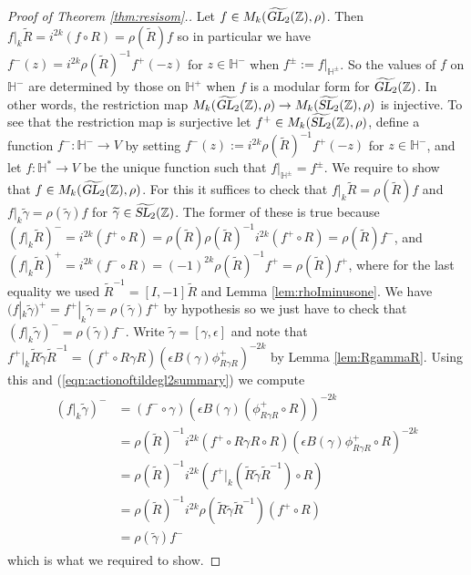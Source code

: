 \documentclass[aps,prd,groupedaddress,preprint,tightenlines,eqsecnum,nofootinbib]{revtex4}
\newcommand{\g}{\gamma}
\newcommand{\e}{\epsilon}
\newcommand{\SL}{\operatorname{\textsl{SL}}}      %
\newcommand{\GL}{\operatorname{\textsl{GL}}}      %
\newcommand{\Z}{{\mathbb Z}}%
\newcommand{\HH}{{\mathbb H}}%
\newcommand{\WT}{\widetilde}
\begin{document}
\begin{proof}[Proof of Theorem \ref{thm:resisom}.]
Let $f\in M_k(\widetilde{\GL_2}(\Z),\rho)$. Then $f|_k\WT R =i^{2k}(f\circ R)= \rho(\WT R)f$ so in particular we have $f^-(z)=i^{2k}\rho(\WT R)^{-1}f^+(-z)$ for $z\in \HH^-$ when $f^\pm:=f|_{\HH^\pm}$. So the values of $f$ on $\HH^-$ are determined by those on $\HH^+$ when $f$ is a modular form for $\widetilde{\GL_2}(\Z)$. In other words, the restriction map $M_k(\widetilde{\GL_2}(\Z),\rho)\to M_k(\widetilde{\SL_2}(\Z),\rho)$ is injective. To see that the restriction map is surjective let $f^+\in M_k(\widetilde{\SL_2}(\Z),\rho)$, define a function $f^-:\HH^-\to V$ by setting $f^-(z):=i^{2k}\rho(\WT R)^{-1}f^+(-z)$ for $z\in \HH^-$, and let $f:\HH^*\to V$ be the unique function such that $f|_{\HH^\pm}=f^\pm$. We require to show that $f\in M_k(\widetilde{\GL_2}(\Z),\rho)$. For this it suffices to check that $f|_k\WT R=\rho(\WT R)f$ and $f|_k\WT\g=\rho(\WT \g)f$ for $\WT \g\in \widetilde{\SL_2}(\Z)$. The former of these is true because $(f|_k\WT R)^-=i^{2k}(f^+\circ R)=\rho(\WT R)\rho(\WT R)^{-1}i^{2k}(f^+\circ R)=\rho(\WT R)f^-$, and $(f|_k\WT R)^+=i^{2k}(f^-\circ R)=(-1)^{2k}\rho(\WT R)^{-1}f^+=\rho(\WT R)f^+$, where for the last equality we used $\WT R^{-1}= [I,-1]\WT R$ and Lemma \ref{lem:rhoIminusone}. We have $(f|_k\WT\g)^+=f^+|_k\WT\g=\rho(\WT \g)f^+$ by hypothesis so we just have to check that $(f|_k\WT \g)^-=\rho(\WT \g)f^-$. Write $\WT\g=[\g,\e]$ and note that $f^+|_k\WT R\WT\g\WT R^{-1}=(f^+\circ R\g R)(\e B(\g)\phi^+_{R\g R})^{-2k}$ by Lemma \ref{lem:RgammaR}. Using this and (\ref{eqn:actionoftildegl2summary}) we compute
\begin{gather}
\begin{split}
(f|_k\WT\g)^-&=(f^-\circ\g)(\e B(\g)(\phi^+_{R\g R}\circ R))^{-2k}\\
	&=\rho(\WT R)^{-1}i^{2k}(f^+\circ R\g R\circ R)(\e B(\g)\phi^+_{R\g R}\circ R)^{-2k}\\
	&=\rho(\WT R)^{-1}i^{2k}(f^+|_k(\WT R\WT \g\WT R^{-1})\circ R)\\
	&=\rho(\WT R)^{-1}i^{2k}\rho(\WT R\WT \g\WT R^{-1})(f^+\circ R)\\
	&=\rho(\WT\g)f^-
\end{split}
\end{gather}
which is what we required to show.
\end{proof}
\end{document}
